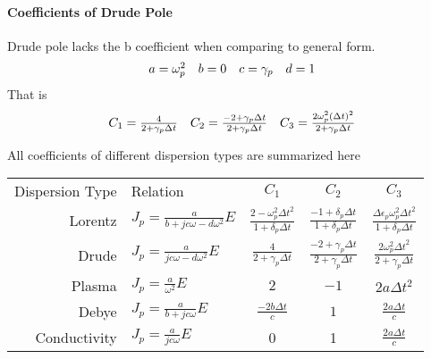 \paragraph{\msjh Coefficients of Drude Pole}
Drude pole lacks the b coefficient when comparing to general form.
\begin{equation*}
  \begin{array}{@{}llll@{}}
    a = \omega_p^2 &
    b = 0 &
    c = \gamma_p &
    d = 1
  \end{array}
\end{equation*}
That is 
\begin{gather*}
  \begin{array}{@{}lll@{}}
    C_1 = \frac{4}{2+ \gamma_p\Delta t} &
    C_2 = \frac{-2+\gamma_p\Delta t}{2+\gamma_p\Delta t} &
    C_3 = \frac{2\omega_p^2(\Delta t)^2}{2+\gamma_p\Delta t}
  \end{array}
\end{gather*}





All coefficients of different dispersion types are summarized here
\begin{center}
  \begin{tabular}[c]{|rlccc|}
    \hline
    Dispersion Type & Relation & $C_1$ & $C_2$ & $C_3$ \\[0.1cm]

    Lorentz 
    & $J_p= \displaystyle\frac{a}{b + jc\omega - d\omega^2}E$ 
    & $\displaystyle\frac{2-\omega_p^2\Delta t^2}{1+\delta_p\Delta t}$ 
    & $\displaystyle\frac{-1 + \delta_p\Delta t}{1+\delta_p\Delta t}$  
    & $\displaystyle\frac{\Delta\epsilon_p\omega_p^2\Delta t^2}{1+\delta_p\Delta t}$ \\[0.5cm]

    Drude 
    & $J_p = \displaystyle\frac{a}{jc\omega - d\omega^2}E$ 
    & $\displaystyle\frac{ 4}{ 2+\gamma_p\Delta t}$ 
    & $\displaystyle\frac{ -2+\gamma_p\Delta t}{ 2+\gamma_p\Delta t}$ 
    & $\displaystyle\frac{ 2\omega_p^2\Delta t^2}{ 2+\gamma_p \Delta t}$\\[0.5cm]

    Plasma 
    & $J_p = \displaystyle\frac{a}{\omega^2} E$ 
    & $2$ 
    & $-1$ 
    & $2a\Delta t^2$\\[0.5cm]

    Debye
    & $J_p = \displaystyle\frac{a}{b+jc\omega} E$ 
    & $\displaystyle\frac{-2b\Delta t}{c}$ 
    & $1$ 
    & $\displaystyle\frac{2a\Delta t}{c}$\\[0.5cm]

    Conductivity
    & $J_p = \displaystyle\frac{a}{jc\omega}E$ 
    & 0 
    & 1 
    & $\displaystyle\frac{2a\Delta t}{c}$\\[0.3cm]
    \hline
  \end{tabular}
\end{center}


